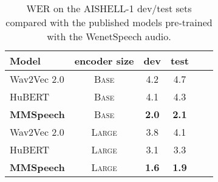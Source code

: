 \documentclass{article}
\begin{document}
\begin{table}[htb]
	\centering
	\caption{WER on the AISHELL-1 dev/test sets compared with the published models pre-trained with the WenetSpeech audio.}
    \vspace{0.1cm}
    \label{compare_with_published}
	\begin{tabular}{l c c c c c}
		\toprule
		Model & encoder size & dev & test \\ 
		\midrule
        Wav2Vec 2.0         & \textsc{Base}   & 4.2   & 4.7 \\
        HuBERT              & \textsc{Base}    & 4.1   & 4.3 \\
        \textbf{MMSpeech}   & \textsc{Base}    & \textbf{2.0}  & \textbf{2.1} \\
        \midrule
        Wav2Vec 2.0         & \textsc{Large}   & 3.8   & 4.1 \\
        HuBERT              & \textsc{Large}   & 3.1   & 3.3 \\
        \textbf{MMSpeech}   & \textsc{Large}   & \textbf{1.6}  & \textbf{1.9} \\
		\bottomrule
	\end{tabular}
\end{table}
\end{document}
